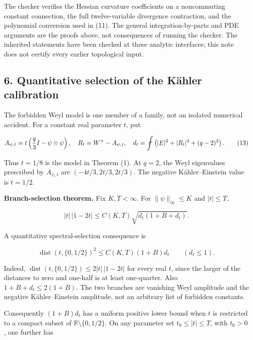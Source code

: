 \documentclass[
  10pt,
]{article}
\begin{document}
The checker verifies the Hessian curvature coefficients on a
noncommuting constant connection, the full twelve-variable divergence
contraction, and the polynomial conversion used in (11). The general
integration-by-parts and PDE arguments are the proofs above, not
consequences of running the checker. The inherited statements have been
checked at these analytic interfaces; this note does not certify every
earlier topological input.

\hypertarget{quantitative-selection-of-the-kuxe4hler-calibration}{%
\subsection{6. Quantitative selection of the Kähler
calibration}\label{quantitative-selection-of-the-kuxe4hler-calibration}}

The forbidden Weyl model is one member of a family, not an isolated
numerical accident. For a constant real parameter \(t\), put

\[
 A_{\psi,t}=t\left({q\over3}I-\psi\otimes\psi\right),
 \quad R_t=W^+-A_{\psi,t},\quad
 d_t=\fint\left(|E|^2+|R_t|^2+(q-2)^2\right).
                                                               \tag{13}
\]

Thus \(t=1/8\) is the model in Theorem (1). At \(q=2\), the Weyl
eigenvalues prescribed by \(A_{\psi,t}\) are \((-4t/3,2t/3,2t/3)\). The
negative Kähler--Einstein value is \(t=1/2\).

\textbf{Branch-selection theorem.} Fix \(K,T<\infty\). For
\(\|\psi\|_\infty\le K\) and \(|t|\le T\),

\[
 \boxed{\quad |t|\,|1-2t|\le C(K,T)
                  \sqrt{d_t(1+B+d_t)}.\quad}             \tag{14}
\]

A quantitative spectral-selection consequence is

\[
 \boxed{\quad
 \operatorname{dist}(t,\{0,1/2\})^2
       \le C(K,T)(1+B)d_t\qquad(d_t\le1).
 \quad}                                                   \tag{14a}
\]

Indeed, \(\operatorname{dist}(t,\{0,1/2\})\le2|t|\,|1-2t|\) for every
real \(t\), since the larger of the distances to zero and one-half is at
least one-quarter. Also \(1+B+d_t\le2(1+B)\). The two branches are
vanishing Weyl amplitude and the negative Kähler--Einstein amplitude,
not an arbitrary list of forbidden constants.

Consequently \((1+B)d_t\) has a uniform positive lower bound when \(t\)
is restricted to a compact subset of \(\mathbb R\setminus\{0,1/2\}\). On
any parameter set \(t_0\le|t|\le T\), with \(t_0>0\), one further has
\end{document}
